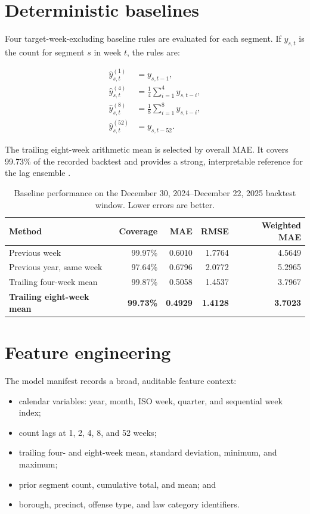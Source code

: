 \documentclass[11pt,oneside]{report}
\begin{document}
\section{Deterministic baselines}

Four target-week-excluding baseline rules are evaluated for each segment. If
$y_{s,t}$ is the count for segment $s$ in week $t$, the rules are:

\begin{align}
  \widehat{y}^{(1)}_{s,t} &= y_{s,t-1}, \\
  \widehat{y}^{(4)}_{s,t} &= \frac{1}{4}\sum_{i=1}^{4} y_{s,t-i}, \\
  \widehat{y}^{(8)}_{s,t} &= \frac{1}{8}\sum_{i=1}^{8} y_{s,t-i}, \\
  \widehat{y}^{(52)}_{s,t} &= y_{s,t-52}.
\end{align}

The trailing eight-week arithmetic mean is selected by overall MAE. It covers
99.73\% of the recorded backtest and provides a strong, interpretable reference
for the lag ensemble \cite{baselinereport,baselinemanifest}.

\begin{table}[htbp]
  \centering
  \caption{Baseline performance on the December 30, 2024--December 22, 2025
  backtest window. Lower errors are better.}
  \label{tab:baseline-results}
  \begin{tabular}{lrrrr}
    \toprule
    \textbf{Method} & \textbf{Coverage} & \textbf{MAE} & \textbf{RMSE} & \textbf{Weighted MAE} \\
    \midrule
    Previous week & 99.97\% & 0.6010 & 1.7764 & 4.5649 \\
    Previous year, same week & 97.64\% & 0.6796 & 2.0772 & 5.2965 \\
    Trailing four-week mean & 99.87\% & 0.5058 & 1.4537 & 3.7967 \\
    \textbf{Trailing eight-week mean} & \textbf{99.73\%} & \textbf{0.4929} & \textbf{1.4128} & \textbf{3.7023} \\
    \bottomrule
  \end{tabular}
\end{table}

\section{Feature engineering}

The model manifest records a broad, auditable feature context:

\begin{itemize}
  \item calendar variables: year, month, ISO week, quarter, and sequential week
    index;
  \item count lags at 1, 2, 4, 8, and 52 weeks;
  \item trailing four- and eight-week mean, standard deviation, minimum, and
    maximum;
  \item prior segment count, cumulative total, and mean; and
  \item borough, precinct, offense type, and law category identifiers.
\end{itemize}
\end{document}
